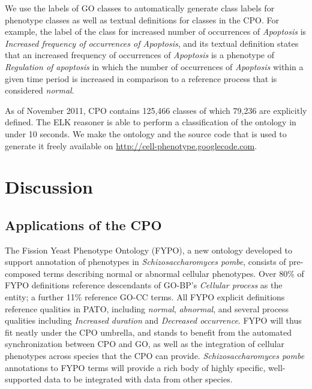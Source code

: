\documentclass{bioinfo}
\renewcommand{\cite}{\citep}
\begin{document}
We use the labels of GO classes to automatically generate class labels
for phenotype classes as well as textual definitions for classes in
the CPO. For example, the label of the class for increased number of
occurrences of {\em Apoptosis} is {\em Increased frequency of
  occurrences of Apoptosis}, and its textual definition states that an
increased frequency of occurrences of {\em Apoptosis} is a phenotype
of {\em Regulation of apoptosis} in which the number of occurrences of
{\em Apoptosis} within a given time period is increased in comparison
to a reference process that is considered {\em normal}.

As of November 2011, CPO contains 125,466 classes of which 79,236 are
explicitly defined.  The ELK reasoner \cite{Kazakov2011} is able to
perform a classification of the ontology in under 10 seconds. We make
the ontology and the source code that is used to generate it freely
available on \url{http://cell-phenotype.googlecode.com}.

\section{Discussion}
\subsection{Applications of the CPO}
The Fission Yeast Phenotype Ontology (FYPO), a new ontology developed
to support annotation of phenotypes in {\em Schizosaccharomyces
  pombe}, consists of pre-composed terms describing normal or abnormal
cellular phenotypes. Over 80\% of FYPO definitions reference
descendants of GO-BP's {\em Cellular process} as the entity; a further
11\% reference GO-CC terms. All FYPO explicit definitions reference
qualities in PATO, including {\em normal}, {\em abnormal}, and several
process qualities including {\em Increased duration} and {\em
  Decreased occurrence}. FYPO will thus fit neatly under the CPO
umbrella, and stands to benefit from the automated synchronization
between CPO and GO, as well as the integration of cellular phenotypes
across species that the CPO can provide. {\em Schizosaccharomyces
  pombe} annotations to FYPO terms will provide a rich body of highly
specific, well-supported data to be integrated with data from other
species.
\end{document}
